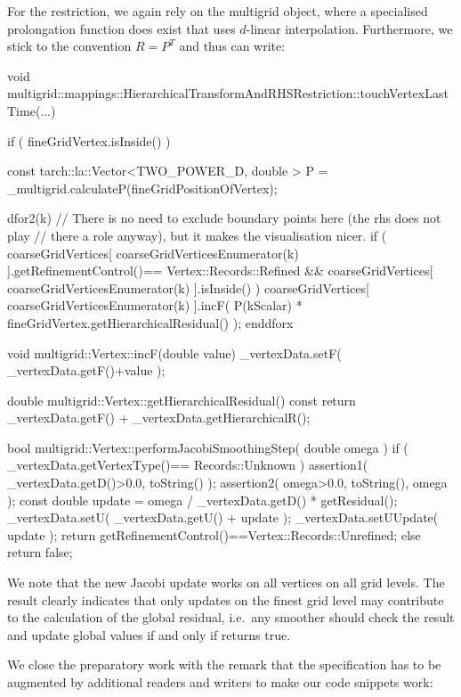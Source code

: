 \noindent 
For the restriction, we again rely on the multigrid object, where a specialised
prolongation function does exist that uses $d$-linear interpolation.
Furthermore, we stick to the convention $R=P^T$ and thus can write:

\begin{code}
void
multigrid::mappings::HierarchicalTransformAndRHSRestriction::touchVertexLastTime(...) {
  if ( fineGridVertex.isInside() ) {
    const tarch::la::Vector<TWO_POWER_D, double > P = 
      _multigrid.calculateP(fineGridPositionOfVertex);

    dfor2(k)
      // There is no need to exclude boundary points here (the rhs does not play
      // there a role anyway), but it makes the visualisation nicer.
      if (
        coarseGridVertices[ coarseGridVerticesEnumerator(k) ].getRefinementControl()==
          Vertex::Records::Refined
        &&
        coarseGridVertices[ coarseGridVerticesEnumerator(k) ].isInside()
      ) {
        coarseGridVertices[ coarseGridVerticesEnumerator(k) ].incF(  
          P(kScalar) * fineGridVertex.getHierarchicalResidual() 
        );
      }
    enddforx
  }
}

void multigrid::Vertex::incF(double value) {
  _vertexData.setF( _vertexData.getF()+value );
}

double multigrid::Vertex::getHierarchicalResidual() const {
  return _vertexData.getF() + _vertexData.getHierarchicalR();
}

bool multigrid::Vertex::performJacobiSmoothingStep( double omega ) {
  if ( _vertexData.getVertexType()== Records::Unknown ) {
    assertion1( _vertexData.getD()>0.0, toString() );
    assertion2( omega>0.0, toString(), omega );
    const double update = omega / _vertexData.getD() * getResidual();
    _vertexData.setU( _vertexData.getU() + update );
    _vertexData.setUUpdate( update );
     return getRefinementControl()==Vertex::Records::Unrefined;
  }
  else {
    return false;
  }
}
\end{code}


\noindent
We note that the new Jacobi update works on all vertices on all grid levels. 
The result clearly indicates that only updates on the finest grid level may
contribute to the calculation of the global residual, i.e.~any smoother should
check the result and update global values if and only if
 returns true.


We close the preparatory work with the remark that the specification has to be
augmented by additional readers and writers to make our code snippets work:

